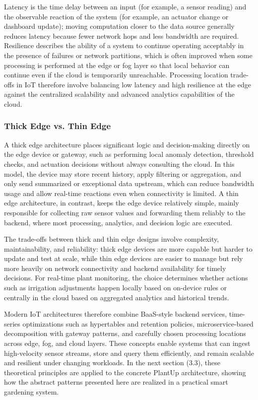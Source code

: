 Latency is the time delay between an input (for example, a sensor reading) and the observable reaction of the system (for example, an actuator change or dashboard update); moving computation closer to the data source generally reduces latency because fewer network hops and less bandwidth are required. Resilience describes the ability of a system to continue operating acceptably in the presence of failures or network partitions, which is often improved when some processing is performed at the edge or fog layer so that local behavior can continue even if the cloud is temporarily unreachable. Processing location trade-offs in IoT therefore involve balancing low latency and high resilience at the edge against the centralized scalability and advanced analytics capabilities of the cloud.

\subsubsection{Thick Edge vs. Thin Edge}
A thick edge architecture places significant logic and decision-making directly on the edge device or gateway, such as performing local anomaly detection, threshold checks, and actuation decisions without always consulting the cloud. In this model, the device may store recent history, apply filtering or aggregation, and only send summarized or exceptional data upstream, which can reduce bandwidth usage and allow real-time reactions even when connectivity is limited. A thin edge architecture, in contrast, keeps the edge device relatively simple, mainly responsible for collecting raw sensor values and forwarding them reliably to the backend, where most processing, analytics, and decision logic are executed.

The trade-offs between thick and thin edge designs involve complexity, maintainability, and reliability: thick edge devices are more capable but harder to update and test at scale, while thin edge devices are easier to manage but rely more heavily on network connectivity and backend availability for timely decisions. For real-time plant monitoring, the choice determines whether actions such as irrigation adjustments happen locally based on on-device rules or centrally in the cloud based on aggregated analytics and historical trends.

Modern IoT architectures therefore combine BaaS-style backend services, time-series optimizations such as hypertables and retention policies, microservice-based decomposition with gateway patterns, and carefully chosen processing locations across edge, fog, and cloud layers. These concepts enable systems that can ingest high-velocity sensor streams, store and query them efficiently, and remain scalable and resilient under changing workloads. In the next section (3.3), these theoretical principles are applied to the concrete PlantUp architecture, showing how the abstract patterns presented here are realized in a practical smart gardening system.
